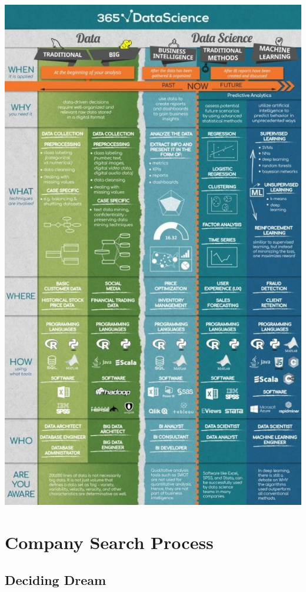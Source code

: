 \documentclass[
]{book}
\begin{document}
\includegraphics{Images/DataScienceRoles.jpg}

\hypertarget{company-search-process}{%
\section{Company Search Process}\label{company-search-process}}

\hypertarget{deciding-dream}{%
\subsection{Deciding Dream}\label{deciding-dream}}
\end{document}

